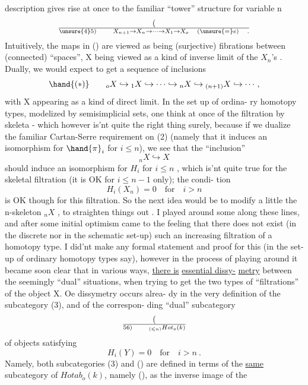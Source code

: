 
description gives rise at once to the familiar ``tower'' structure for
variable n
\[ (\over{\unsure{4}}{5}) \qquad X_{n+1} \to X_n \to \dots \to X_1 \to X_o \quad ( \unsure{=} e ) \quad . \]
Intuitively, the maps in () are viewed as being (surjective) fibrations
between (connected) ``spaces'', X being viewed as a kind of inverse limit
of the $X_n$'s . Dually, we would expect to get a sequence of inclusions
\[ \hand{(*)} \qquad {}_oX \hookrightarrow {}_1X \hookrightarrow \dots \hookrightarrow {}_nX \hookrightarrow {}_{(n+1)}X \hookrightarrow \cdots , \]
with X appearing as  a kind of direct limit. In the set up of ordina-%
ry homotopy types, modelized by semisimplicial sets, one  think
at once of the filtration by skeleta - which however is'nt quite the
right thing surely, because if we dualize the familiar Cartan-Serre
requirement on (2) (namely that it induces an isomorphism for $\hand{\pi}_i$ for
$i \leqslant n$), we see that the ``inclusion''
\[ {}_nX \hookrightarrow X \]
should induce an isomorphism for $H_i$ for $i \leqslant n$ , which is'nt quite
true for the skeletal filtration (it is OK for $i \leqslant n-1$ only); the condi-%
tion
\[ H_i(X_n) = 0 \quad \text{for} \quad i > n \]
is OK though for this filtration. So the next idea would be to modify
a little the n-skeleton ${}_nX$ , to straighten things out .
I played around some along these lines, and after some initial optimism
came to the feeling that there does not exist (in the discrete nor in the
schematic set-up) such an increasing  filtration of a homotopy type. I
did'nt make any formal statement and proof for this (in the set-up of
ordinary homotopy types say), however in the process of playing around
it became soon clear that in various ways, \uline{there is}  \uline{essential dissy-}%
\uline{metry} between the seemingly ``dual'' situations, when trying to get the
two types of ``filtrations'' of the object X. Oe dissymetry occurs alrea-%
dy in the very definition of the subcategory (3), and of the correspon-%
ding ``dual''  subcategory
\[ (\over{5}{6}) \qquad {}_{(\leqslant n)}Hot_o(k) \]
of objects satisfying
\[ H_i(Y) = 0 \quad \text{for} \quad i > n \ . \]
Namely, both subcategories (3) and () are defined in terms of the \uline{same}
subcategory of $Hotab_o(k)$, namely (), as the inverse image of the

